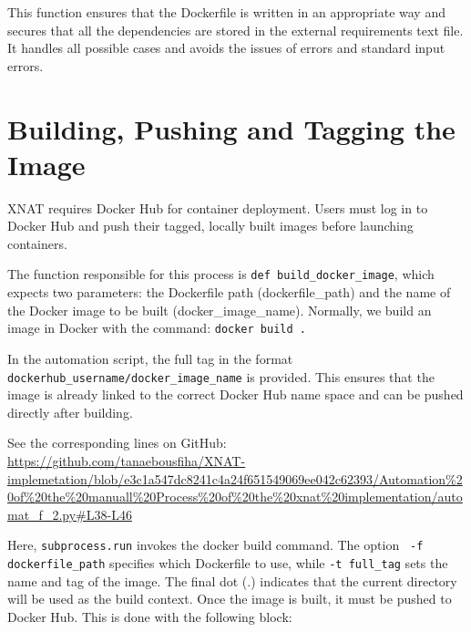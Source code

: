 This function ensures that the Dockerfile is written in an appropriate way and secures that all the dependencies are stored in the external requirements text file. It handles all possible cases and avoids the issues of errors and standard input errors.

\section{Building, Pushing and Tagging the Image}

XNAT requires Docker Hub for container deployment. Users must log in to Docker Hub and push their tagged, locally built images before launching containers.

The function responsible for this process is \texttt{def build\_docker\_image}, which expects two parameters: the Dockerfile path (dockerfile\_path) and the name of the Docker image to be built (docker\_image\_name). Normally, we build an image in Docker with the command: \texttt{docker build .}


In the automation script, the full tag in the format \texttt{dockerhub\_username/docker\_image\_name} is provided. This ensures that the image is already linked to the correct Docker Hub name space and can be pushed directly after building.




\noindent\footnotesize See the corresponding lines on GitHub:\url{ https://github.com/tanaebousfiha/XNAT-implemetation/blob/e3c1a547dc8241c4a24f651549069ee042c62393/Automation%20of%20the%20manuall%20Process%20of%20the%20xnat%20implementation/automat_f_2.py#L38-L46}







Here, \texttt{subprocess.run} invokes the docker build command. The option \texttt{ -f dockerfile\_path} specifies which Dockerfile to use, while \texttt{-t full\_tag} sets the name and tag of the image. The final dot (.) indicates that the current directory will be used as the build context.
Once the image is built, it must be pushed to Docker Hub. This is done with the following block:



